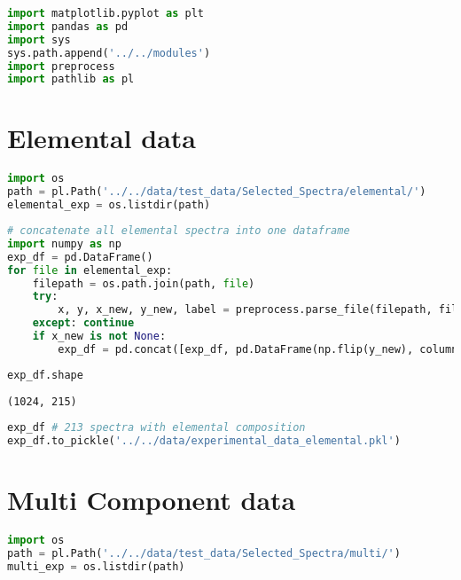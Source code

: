 \begin{lstlisting}[language=Python]
import matplotlib.pyplot as plt
import pandas as pd
import sys
sys.path.append('../../modules')
import preprocess
import pathlib as pl
\end{lstlisting}

\hypertarget{experimental-data}{%
\section*{Elemental data}\label{experimental-data}}

\begin{lstlisting}[language=Python]
import os
path = pl.Path('../../data/test_data/Selected_Spectra/elemental/')
elemental_exp = os.listdir(path)
\end{lstlisting}

\begin{lstlisting}[language=Python]
# concatenate all elemental spectra into one dataframe
import numpy as np
exp_df = pd.DataFrame()
for file in elemental_exp:
    filepath = os.path.join(path, file)
    try:
        x, y, x_new, y_new, label = preprocess.parse_file(filepath, filetype='vms', scale=True, N_points=1024)
    except: continue
    if x_new is not None:
        exp_df = pd.concat([exp_df, pd.DataFrame(np.flip(y_new), columns=['_'.join(label)])], axis=1)
\end{lstlisting}

\begin{lstlisting}[language=Python]
exp_df.shape
\end{lstlisting}

\begin{lstlisting}
(1024, 215)
\end{lstlisting}

\begin{lstlisting}[language=Python]
exp_df # 213 spectra with elemental composition
exp_df.to_pickle('../../data/experimental_data_elemental.pkl')
\end{lstlisting}

\hypertarget{multi-component-data}{%
\section*{Multi Component data}\label{multi-component-data}}

\begin{lstlisting}[language=Python]
import os
path = pl.Path('../../data/test_data/Selected_Spectra/multi/')
multi_exp = os.listdir(path)
\end{lstlisting}

